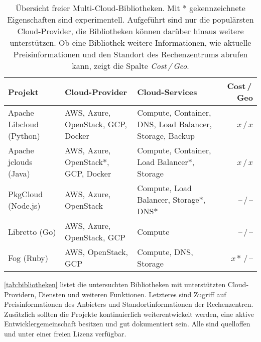 \begin{table*}\centering
	\begin{minipage}{\textwidth}
		\caption{Übersicht freier Multi-Cloud-Bibliotheken. Mit $*$ gekennzeichnete Eigenschaften sind experimentell. Aufgeführt sind nur die populärsten Cloud-Provider, die Bibliotheken können darüber hinaus weitere unterstützen. Ob eine Bibliothek weitere Informationen, wie aktuelle Preisinformationen und den Standort des Rechenzentrums abrufen kann, zeigt die Spalte \emph{Cost\,/\,Geo}.}
		\begin{tabularx}{\textwidth}{>{\centering}XXXr} \toprule
			Projekt & Cloud-Provider & Cloud-Services & Cost\,/\,Geo\\ \midrule
			Apache Libcloud (Python)\footnotemark & AWS, Azure, OpenStack, GCP, Docker & Compute, Container, DNS, Load Balancer, Storage, Backup & $x$\,/\,$x$\\
			Apache jclouds (Java)\footnotemark & AWS, Azure, Open\-Stack$*$, GCP, Docker & Compute, Container, Load Balancer$*$, Storage & $x$\,/\,$x$\\
			PkgCloud (Node.js)\footnotemark & AWS, Azure, OpenStack& Compute, Load Balancer, Storage$*$, DNS$*$ & --\,/\,--\\
			Libretto (Go)\footnotemark & AWS, Azure, OpenStack, GCP & Compute & --\,/\,--\\
			Fog (Ruby)\footnotemark & AWS, OpenStack, GCP & Compute, DNS, Storage & $x*$\,/\,--\\
			\bottomrule
		\end{tabularx}
		\label{tab:bibliotheken}
		\vspace{150pt}
	\end{minipage}  
\end{table*}

\autoref*{tab:bibliotheken} listet die untersuchten Bibliotheken mit unterstützten Cloud-Providern, Diensten und weiteren Funktionen. Letzteres sind Zugriff auf Preisinformationen des Anbieters und Standortinformationen der Rechenzentren. Zusätzlich sollten die Projekte kontinuierlich weiterentwickelt werden, eine aktive Entwicklergemeinschaft besitzen und gut dokumentiert sein. Alle sind quelloffen und unter einer freien Lizenz verfügbar.

